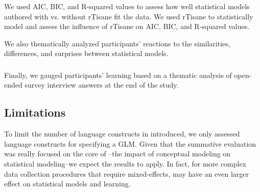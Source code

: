 \subsubsection{\evalStatisticalModels}
We used AIC, BIC, and R-squared values to assess how well statistical models
authored with vs. without rTisane fit the data. We used rTisane to statistically
model and assess the influence of rTisane on AIC, BIC, and R-squared values.

We also thematically analyzed participants' reactions to the similarities,
differences, and surprises between statistical models. 


\subsubsection{\evalLearning}
Finally, we gauged participants' learning based on a thematic analysis of
open-ended survey interview answers at the end of the study. 

\subsection{Limitations}
To limit the number of language constructs in \rTisane introduced, we only
assessed language constructs for specifying a GLM. Given that the summative
evaluation was really focused on the core of \rTisane--the impact of conceptual
modeling on statistical modeling--we expect the results to apply. In fact, for
more complex data collection procedures that require mixed-effects, \rTisane may
have an even larger effect on statistical models and learning. 